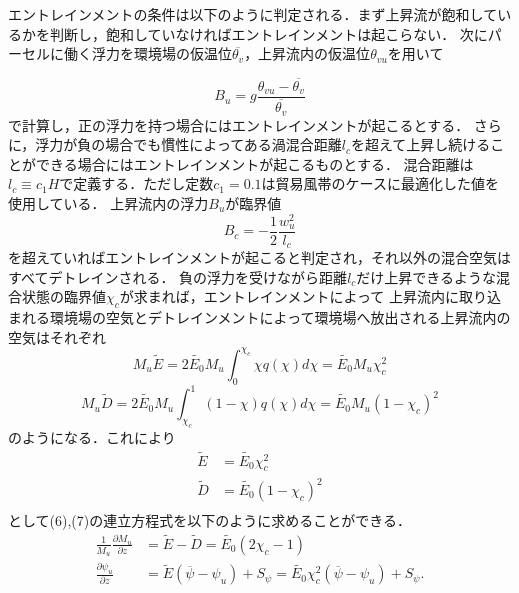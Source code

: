 \documentclass[platex, dvipdfmx]{jsarticle}
\begin{document}

エントレインメントの条件は以下のように判定される．まず上昇流が飽和しているかを判断し，飽和していなければエントレインメントは起こらない．
次にパーセルに働く浮力を環境場の仮温位$\overline{\theta_v}$，上昇流内の仮温位$\theta_{vu}$を用いて

\begin{equation}
    B_u = g\frac{\theta_{vu} - \overline{\theta_{v}}}{ \overline{\theta_v}}
\end{equation}
で計算し，正の浮力を持つ場合にはエントレインメントが起こるとする．
さらに，浮力が負の場合でも慣性によってある渦混合距離$l_c$を超えて上昇し続けることができる場合にはエントレインメントが起こるものとする．
混合距離は$l_c \equiv c_1 H$で定義する．ただし定数$c_1=0.1$は貿易風帯のケースに最適化した値を使用している．
上昇流内の浮力$B_u$が臨界値
\begin{equation}
    B_c = -\frac{1}{2}\frac{w_u^2}{l_c}    
\end{equation}
を超えていればエントレインメントが起こると判定され，それ以外の混合空気はすべてデトレインされる．
負の浮力を受けながら距離$l_c$だけ上昇できるような混合状態の臨界値$\chi_c$が求まれば，エントレインメントによって
上昇流内に取り込まれる環境場の空気とデトレインメントによって環境場へ放出される上昇流内の空気はそれぞれ
\begin{equation}
    M_u\tilde{E}=2\tilde{E_0} M_u\int_0^{\chi_c}\chi q(\chi) d\chi = \tilde{E_0} M_u \chi_c^2    
\end{equation}
\begin{equation}
    M_u\tilde{D}=2\tilde{E_0} M_u\int_{\chi_c}^{1}(1-\chi) q(\chi) d\chi = \tilde{E_0} M_u (1-\chi_c)^2
\end{equation}
のようになる．これにより
\begin{align}
    \tilde{E}&=\tilde{E_0}\chi_c^2 \\
    \tilde{D}&=\tilde{E_0}(1-\chi_c)^2 \\
\end{align}
として(6),(7)の連立方程式を以下のように求めることができる．
\begin{align}
    \frac{1}{M_u}\frac{\partial M_u}{\partial z} &= \tilde{E} - \tilde{D} = \tilde{E_0}(2\chi_c - 1) \label{M_u}\\
    \frac{\partial \psi_u}{\partial z} &= \tilde{E} (\overline{\psi}-\psi_u) + S_{\psi} = \tilde{E_0}\chi_c^2(\overline{\psi}-\psi_u) \label{psi_u} + S_{\psi}.\\
\end{align}
\end{document}
